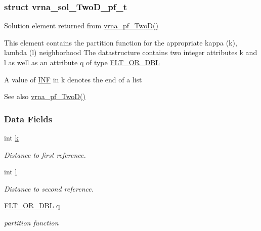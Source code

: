 \subsubsection{struct vrna\+\_\+sol\+\_\+\+Two\+D\+\_\+pf\+\_\+t}
Solution element returned from \hyperlink{group__kl__neighborhood__pf_ga0bc3427689bd09da09b8b3094a27f836}{vrna\+\_\+pf\+\_\+\+Two\+D()} 

This element contains the partition function for the appropriate kappa (k), lambda (l) neighborhood The datastructure contains two integer attributes \textquotesingle{}k\textquotesingle{} and \textquotesingle{}l\textquotesingle{} as well as an attribute \textquotesingle{}q\textquotesingle{} of type \hyperlink{group__data__structures_ga31125aeace516926bf7f251f759b6126}{F\+L\+T\+\_\+\+O\+R\+\_\+\+D\+BL}

A value of \hyperlink{energy__const_8h_a12c2040f25d8e3a7b9e1c2024c618cb6}{I\+NF} in k denotes the end of a list

\begin{DoxySeeAlso}{See also}
\hyperlink{group__kl__neighborhood__pf_ga0bc3427689bd09da09b8b3094a27f836}{vrna\+\_\+pf\+\_\+\+Two\+D()} 
\end{DoxySeeAlso}
\subsubsection*{Data Fields}
\begin{DoxyCompactItemize}
\item 
\mbox{\label{group__kl__neighborhood__pf_ad1f23b46dc4ebd373abdeb0382d87b83}} 
int \hyperlink{group__kl__neighborhood__pf_ad1f23b46dc4ebd373abdeb0382d87b83}{k}
\begin{DoxyCompactList}\small\item\em Distance to first reference. \end{DoxyCompactList}\item 
\mbox{\label{group__kl__neighborhood__pf_a01133c264eff2c988d144e07803d1b8b}} 
int \hyperlink{group__kl__neighborhood__pf_a01133c264eff2c988d144e07803d1b8b}{l}
\begin{DoxyCompactList}\small\item\em Distance to second reference. \end{DoxyCompactList}\item 
\mbox{\label{group__kl__neighborhood__pf_a17ebbf425b8769ded74b5c7b85e58ee1}} 
\hyperlink{group__data__structures_ga31125aeace516926bf7f251f759b6126}{F\+L\+T\+\_\+\+O\+R\+\_\+\+D\+BL} \hyperlink{group__kl__neighborhood__pf_a17ebbf425b8769ded74b5c7b85e58ee1}{q}
\begin{DoxyCompactList}\small\item\em partition function \end{DoxyCompactList}\end{DoxyCompactItemize}


